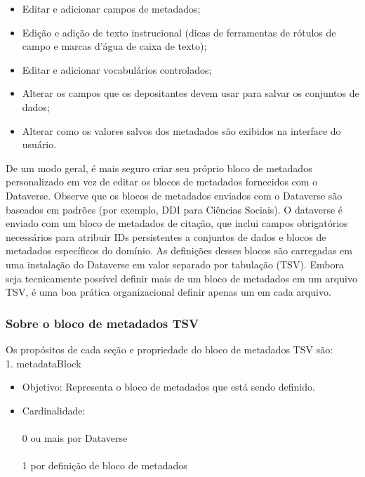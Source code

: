 \documentclass[12pt,hidelinks]{article}
\begin{document}
\begin{itemize}

\item Editar e adicionar campos de metadados;

\item Edição e adição de texto instrucional (dicas de ferramentas de rótulos de campo e marcas d'água de caixa de texto);

\item Editar e adicionar vocabulários controlados;

\item Alterar os campos que os depositantes devem usar para salvar os conjuntos de dados;

\item Alterar como os valores salvos dos metadados são exibidos na interface do usuário.

\end{itemize}

De um modo geral, é mais seguro criar seu próprio bloco de metadados personalizado em vez de editar os blocos de metadados fornecidos com o Dataverse. Observe que os blocos de metadados enviados com o Dataverse são baseados em padrões (por exemplo, DDI para Ciências Sociais). O dataverse é enviado com um bloco de metadados de citação, que inclui campos obrigatórios necessários para atribuir IDs persistentes a conjuntos de dados e blocos de metadados específicos do domínio. As definições desses blocos são carregadas em uma instalação do Dataverse em valor separado por tabulação (TSV). Embora seja tecnicamente possível definir mais de um bloco de metadados em um arquivo TSV, é uma boa prática organizacional definir apenas um em cada arquivo.

\subsubsection{Sobre o bloco de metadados TSV}

 \qquad Os propósitos de cada seção e propriedade do bloco de metadados TSV são:\\

1. metadataBlock

\begin{itemize}
   
 \item Objetivo: Representa o bloco de metadados que está sendo definido.
 
 \item Cardinalidade:\\\\
0 ou mais por Dataverse\\\\
1 por definição de bloco de metadados

\end{itemize}
\end{document}
